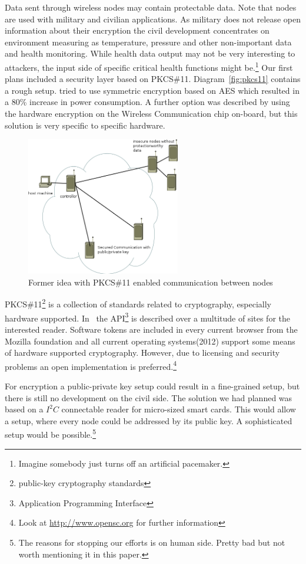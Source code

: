 Data sent through wireless nodes may contain protectable data. Note that nodes are used with military and civilian applications. As military does
not release open information about their encryption the civil development concentrates on environment measuring as temperature, pressure and other 
non-important data and health monitoring.\cite{Dispert}
While health data output may not be very interesting to attackers, the input side of specific critical health functions might be.\footnote{Imagine somebody 
just turns off an artificial pacemaker.}
Our first plans included a security layer based on \textsc{PKCS\#11}. Diagram~\ref{fig:pkcs11} contains a rough setup. \cite{wsnsec} tried to 
use symmetric encryption based on \textsc{AES} which resulted in a 80\% increase in power consumption. A further option was described by 
using the hardware encryption on the Wireless Communication chip on-board, but this solution is very specific to specific hardware.

\begin{figure}[h]
   \centering
   \includegraphics[width=0.6\textwidth]{pic/pkcs11.png}%
   \caption{Former idea with PKCS\#11 enabled communication between nodes}
   \label{pkcs11}%
\end{figure}


\textsc{PKCS\#11}\footnote{public-key cryptography standards} is a collection of standards related to cryptography, especially hardware supported.
In~\cite{PKCS_RSA} the API\footnote{Application Programming Interface} is described over a multitude of sites for the interested reader.
Software tokens are included in every current browser from the Mozilla foundation and all current operating systems(2012) support some means of 
hardware supported cryptography. However, due to licensing and security problems an open implementation is preferred.\footnote{Look at \url{http://www.opensc.org} for further information}

For encryption a public-private key setup could result in a fine-grained setup, but there is still no development on the civil side.
The solution we had planned was based on a \(I^2C\) connectable reader for micro-sized smart cards. This would allow a setup, where every node
could be addressed by its public key. A sophisticated setup would be possible.\footnote{The reasons for stopping our efforts is on human side. Pretty
bad but not worth mentioning it in this paper.}
